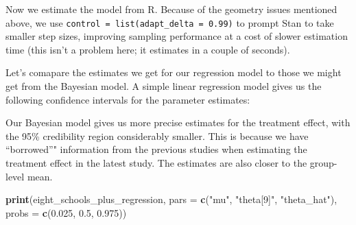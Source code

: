 \documentclass[]{book}
\newenvironment{Shaded}{\begin{snugshade}}{\end{snugshade}}
\newcommand{\KeywordTok}[1]{\textcolor[rgb]{0.13,0.29,0.53}{\textbf{{#1}}}}
\newcommand{\DataTypeTok}[1]{\textcolor[rgb]{0.13,0.29,0.53}{{#1}}}
\newcommand{\DecValTok}[1]{\textcolor[rgb]{0.00,0.00,0.81}{{#1}}}
\newcommand{\FloatTok}[1]{\textcolor[rgb]{0.00,0.00,0.81}{{#1}}}
\newcommand{\StringTok}[1]{\textcolor[rgb]{0.31,0.60,0.02}{{#1}}}
\newcommand{\NormalTok}[1]{{#1}}
\begin{document}
Now we estimate the model from R. Because of the geometry issues
mentioned above, we use \texttt{control\ =\ list(adapt\_delta\ =\ 0.99)}
to prompt Stan to take smaller step sizes, improving sampling
performance at a cost of slower estimation time (this isn't a problem
here; it estimates in a couple of seconds).

\begin{Shaded}
\end{Shaded}

Let's comapare the estimates we get for our regression model to those we
might get from the Bayesian model. A simple linear regression model
gives us the following confidence intervals for the parameter estimates:

Our Bayesian model gives us more precise estimates for the treatment
effect, with the 95\% credibility region considerably smaller. This is
because we have ``borrowed''" information from the previous studies when
estimating the treatment effect in the latest study. The estimates are
also closer to the group-level mean.

\begin{Shaded}
\begin{Highlighting}[]
\KeywordTok{print}\NormalTok{(eight_schools_plus_regression, }\DataTypeTok{pars =} \KeywordTok{c}\NormalTok{(}\StringTok{"mu"}\NormalTok{, }\StringTok{"theta[9]"}\NormalTok{, }\StringTok{"theta_hat"}\NormalTok{), }\DataTypeTok{probs =} \KeywordTok{c}\NormalTok{(}\FloatTok{0.025}\NormalTok{, }\FloatTok{0.5}\NormalTok{, }\FloatTok{0.975}\NormalTok{))}
\end{Highlighting}
\end{Shaded}
\end{document}
